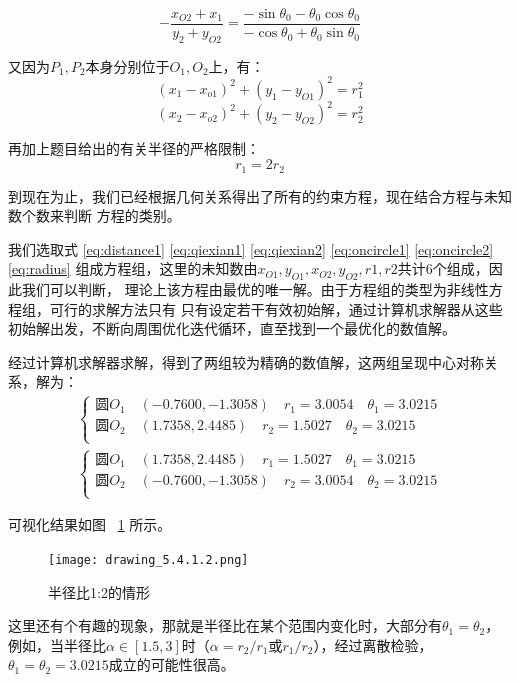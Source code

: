 \documentclass{cumcmthesis1}
\begin{document}
\begin{equation}
    -\frac{x_{O2}+x_1}{y_2+y_{O2}}=\frac{-\sin \theta_0-\theta_0 \cos \theta_0}{-\cos \theta_0+\theta_0 \sin \theta_0}
    \label{eq:qiexian2}
\end{equation}
\par
又因为$P_1,P_2$本身分别位于$O_1,O_2$上，有：
\begin{equation}
    (x_{1}-x_{o1})^2+(y_{1}-y_{O1})^2=r_1^2
    \label{eq:oncircle1}
\end{equation}
\begin{equation}
    (x_{2}-x_{o2})^2+(y_{2}-y_{O2})^2=r_2^2
    \label{eq:oncircle2}
\end{equation}
\par
再加上题目给出的有关半径的严格限制：
\begin{equation}
    r_1=2r_2
    \label{eq:radius}
\end{equation}
\par
到现在为止，我们已经根据几何关系得出了所有的约束方程，现在结合方程与未知数个数来判断
方程的类别。
\par
我们选取式 \eqref{eq:distance1} 
\eqref{eq:qiexian1}
\eqref{eq:qiexian2}
\eqref{eq:oncircle1}
\eqref{eq:oncircle2}
\eqref{eq:radius}
组成方程组，这里的未知数由$x_{O1},y_{O1},
x_{O2},y_{O2},r1,r2$共计6个组成，因此我们可以判断，
理论上该方程由最优的唯一解。由于方程组的类型为非线性方程组，可行的求解方法只有
只有设定若干有效初始解，通过计算机求解器从这些初始解出发，不断向周围优化迭代循环，直至找到一个最优化的数值解。
\par
经过计算机求解器求解，得到了两组较为精确的数值解，这两组呈现中心对称关系，解为：
\begin{align}
    \begin{cases}
        \text{圆}O_1 \quad (-0.7600,-1.3058) \quad r_1=3.0054 \quad \theta_1=3.0215\\
        \text{圆}O_2 \quad (1.7358,2.4485) \quad r_2=1.5027 \quad \theta_2=3.0215\\
    \end{cases}
\end{align}
\begin{align}
    \begin{cases}
        \text{圆}O_1 \quad (1.7358,2.4485) \quad r_1=1.5027 \quad \theta_1=3.0215\\
        \text{圆}O_2 \quad (-0.7600,-1.3058) \quad r_2=3.0054 \quad \theta_2=3.0215\\
    \end{cases}
\end{align}
\par
可视化结果如图
~\ref{1:2} 
所示。
\begin{figure}
    \caption{半径比1:2的情形}
    \centering    
    \texttt{[image: drawing\_5.4.1.2.png]}
    \label{1:2}
\end{figure}
\par
这里还有个有趣的现象，那就是半径比在某个范围内变化时，大部分有$\theta_1=\theta_2$，例如，当半径比$\alpha \in [1.5,3]$时（$\alpha=r_2  /r_1$或$r_1/r_2$），经过离散检验，
$\theta_1=\theta_2=3.0215$成立的可能性很高。
\end{document}
